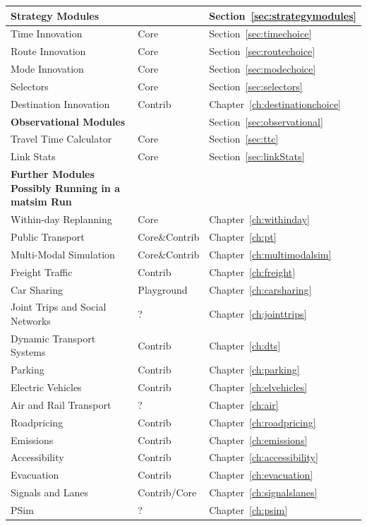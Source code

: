\begin{center}
\begin{longtable}{|l|l|l|}
	\hline
	\textbf{Strategy Modules} & & Section~\ref{sec:strategymodules} \\
	\hline
	Time Innovation & Core & Section~\ref{sec:timechoice} \\
	Route Innovation & Core & Section~\ref{sec:routechoice} \\
	Mode Innovation & Core & Section~\ref{sec:modechoice} \\
	Selectors & Core & Section~\ref{sec:selectors} \\
	Destination Innovation & Contrib & Chapter~\ref{ch:destinationchoice} \\
	\hline
	\textbf{Observational Modules} & & Section~\ref{sec:observational} \\
	\hline
	Travel Time Calculator & Core & Section~\ref{sec:ttc} \\
	Link Stats & Core & Section~\ref{sec:linkStats} \\
	\hline
	\textbf{Further Modules Possibly Running in a \gls{matsim} Run} & &\\
	\hline
	Within-day Replanning & Core & Chapter~\ref{ch:withinday} \\
	Public Transport & Core\&Contrib & Chapter~\ref{ch:pt} \\
	Multi-Modal Simulation & Core\&Contrib & Chapter~\ref{ch:multimodalsim} \\
	Freight Traffic & Contrib & Chapter~\ref{ch:freight} \\
	Car Sharing & Playground & Chapter~\ref{ch:carsharing} \\
	Joint Trips and Social Networks & ? & Chapter~\ref{ch:jointtrips} \\
	Dynamic Transport Systems & Contrib & Chapter~\ref{ch:dts} \\
	Parking & Contrib & Chapter~\ref{ch:parking} \\
	Electric Vehicles & Contrib & Chapter~\ref{ch:elvehicles} \\
	Air and Rail Transport & ? & Chapter~\ref{ch:air} \\
	Roadpricing & Contrib & Chapter~\ref{ch:roadpricing} \\
	Emissions & Contrib & Chapter~\ref{ch:emissions} \\
	Accessibility & Contrib & Chapter~\ref{ch:accessibility} \\
	Evacuation & Contrib & Chapter~\ref{ch:evacuation}  \\
	Signals and Lanes & Contrib/Core& Chapter~\ref{ch:signalslanes} \\
	PSim & ? & Chapter~\ref{ch:psim} \\

\end{longtable}
\end{center}

